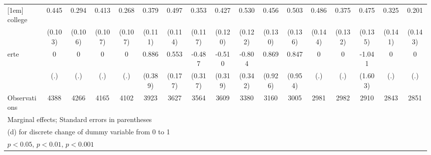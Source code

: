 {\begin{tabular}{l*{16}{c}}
[1em]
college             &       0.445\sym{***}&       0.294\sym{**} &       0.413\sym{***}&       0.268\sym{*}  &       0.379\sym{***}&       0.497\sym{***}&       0.353\sym{**} &       0.427\sym{***}&       0.530\sym{***}&       0.456\sym{***}&       0.503\sym{***}&       0.486\sym{***}&       0.375\sym{**} &       0.475\sym{***}&       0.325\sym{*}  &       0.201         \\
                    &     (0.103)         &     (0.106)         &     (0.107)         &     (0.107)         &     (0.111)         &     (0.114)         &     (0.117)         &     (0.120)         &     (0.122)         &     (0.130)         &     (0.136)         &     (0.144)         &     (0.132)         &     (0.135)         &     (0.141)         &     (0.143)         \\
[1em]
erte                &           0         &           0         &           0         &           0         &       0.886\sym{*}  &       0.553\sym{**} &      -0.487         &      -0.510         &      -0.804\sym{*}  &       0.869         &       0.847         &           0         &           0         &      -1.041         &           0         &           0         \\
                    &         (.)         &         (.)         &         (.)         &         (.)         &     (0.389)         &     (0.177)         &     (0.317)         &     (0.319)         &     (0.342)         &     (0.926)         &     (0.954)         &         (.)         &         (.)         &     (1.603)         &         (.)         &         (.)         \\
\hline
Observations        &        4388         &        4266         &        4165         &        4102         &        3923         &        3627         &        3564         &        3609         &        3380         &        3160         &        3005         &        2981         &        2982         &        2910         &        2843         &        2851         \\
\hline\hline
\multicolumn{17}{l}{\footnotesize Marginal effects; Standard errors in parentheses}\\
\multicolumn{17}{l}{\footnotesize  (d) for discrete change of dummy variable from 0 to 1}\\
\multicolumn{17}{l}{\footnotesize \sym{*} \(p<0.05\), \sym{**} \(p<0.01\), \sym{***} \(p<0.001\)}\\
\end{tabular}
}
